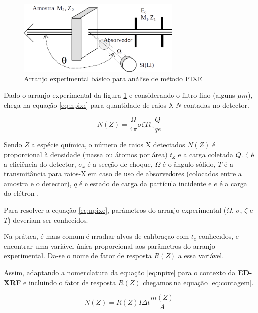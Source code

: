\begin{figure}[H]
\begin{center} 
  \includegraphics[width=0.7\textwidth]{../inputs/images/arranjopixe.png}
  \caption{Arranjo experimental básico para análise de método PIXE 
           \citep{tabacniks2000} \label{fig:arranjopixe}}
\end{center}
\end{figure}

Dado o arranjo experimental da figura \ref{fig:arranjopixe} e
considerando o filtro fino (alguns $\mu m$),
\citep{tabacniks2000} chega na equação \ref{eq:npixe} para 
quantidade de raios X $N$ contadas no detector. 

\begin{equation}
  \label{eq:npixe}
  N(Z) = \frac{\Omega}{4\pi} \sigma \zeta T t_z \frac{Q}{qe}
\end{equation}

Sendo $Z$ a espécie química, o número de raios X detectados 
$N(Z)$ é proporcional à densidade (massa ou átomos por área) $t_Z$ 
e a carga coletada $Q$.
$\zeta$ é a eficiência do detector, $\sigma_x$ é a secção de choque, 
$\Omega$ é o ângulo sólido, $T$ é a transmitância para raios-X em 
caso de uso de absorvedores (colocados entre a amostra e o detector), 
$q$ é o estado de carga da partícula incidente e 
$e$ é a carga do elétron \citep{tabacniks1983}.

Para resolver a equação \ref{eq:npixe}, parâmetros do arranjo experimental
($\Omega$, $\sigma$, $\zeta$ e $T$) deveriam ser conhecidos. 

Na prática, é mais comum é irradiar alvos de calibração com $t_z$ conhecidos,
e encontrar uma variável única proporcional aos parâmetros do arranjo experimental.
Da-se o nome de fator de resposta $R(Z)$ a essa variável.

Assim, adaptando a nomenclatura da equação \ref{eq:npixe} para o contexto 
da \textbf{ED-XRF} e incluindo o fator de resposta $R(Z)$ chegamos na equação 
\ref{eq:contagem}.

\begin{equation}
  \label{eq:contagem}
  N(Z) = R(Z) I\Delta t \frac{m(Z)}{A}
\end{equation}

